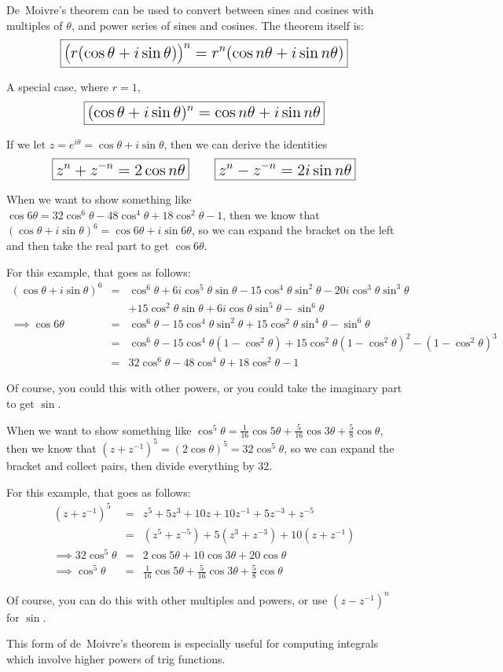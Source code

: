 \documentclass[../main.tex]{subfile}
\begin{document}

De~Moivre's theorem can be used to convert between sines and cosines with multiples of $\theta$, and power series of sines and cosines. The theorem itself is:
$$\Large \boxed{\big( r (\cos\theta + i\sin\theta) \big)^n = r^n (\cos n\theta + i\sin n\theta)}$$

A special case, where $r = 1$,
$$\Large \boxed{(\cos\theta + i\sin\theta)^n = \cos n\theta + i\sin n\theta}$$

If we let $z = e^{i\theta} = \cos\theta + i\sin\theta$, then we can derive the identities $$\Large \boxed{z^n + z^{-n} = 2\cos n\theta}\ \ \ \ \ \boxed{z^n - z^{-n} = 2i\sin n\theta}$$


When we want to show something like $\cos 6\theta = 32\cos^6 \theta - 48\cos^4 \theta + 18\cos^2 \theta - 1$, then we know that $(\cos\theta + i\sin\theta)^6 = \cos 6\theta + i\sin 6\theta$, so we can expand the bracket on the left and then take the real part to get $\cos 6\theta$.

For this example, that goes as follows:
\begin{eqnarray*}
	(\cos\theta + i\sin\theta)^6 &=& \cos^6\theta + 6i\cos^5\theta\sin\theta - 15\cos^4\theta\sin^2\theta - 20i\cos^3\theta\sin^3\theta\\
	& & + 15\cos^2\theta\sin\theta + 6i\cos\theta\sin^5\theta - \sin^6\theta\\
	\implies \cos 6\theta &=& \cos^6\theta - 15\cos^4\theta\sin^2\theta + 15\cos^2\theta\sin^4\theta - \sin^6\theta\\
	&=& \cos^6\theta - 15\cos^4\theta(1 - \cos^2\theta) + 15\cos^2\theta(1 - \cos^2\theta)^2 - (1 - \cos^2\theta)^3\\
	&=& 32\cos^6 \theta - 48\cos^4 \theta + 18\cos^2 \theta - 1
\end{eqnarray*}

Of course, you could this with other powers, or you could take the imaginary part to get $\sin$.


When we want to show something like $\cos^5\theta = \frac{1}{16}\cos 5\theta + \frac{5}{16}\cos 3\theta + \frac{5}{8}\cos\theta$, then we know that $(z + z^{-1})^5 = (2\cos\theta)^5 = 32\cos^5\theta$, so we can expand the bracket and collect pairs, then divide everything by 32.

For this example, that goes as follows:
\begin{eqnarray*}
	(z + z^{-1})^5 &=& z^5 + 5z^3 + 10z + 10z^{-1} + 5z^{-3} + z^{-5}\\
	&=& (z^5 + z^{-5}) + 5(z^3 + z^{-3}) + 10(z + z^{-1})\\
	\implies 32\cos^5\theta &=& 2\cos 5\theta + 10\cos 3\theta + 20\cos\theta\\
	\implies \cos^5\theta &=& \frac{1}{16}\cos 5\theta + \frac{5}{16}\cos 3\theta + \frac{5}{8}\cos\theta
\end{eqnarray*}

Of course, you can do this with other multiples and powers, or use $(z - z^{-1})^n$ for $\sin$.

This form of de~Moivre's theorem is especially useful for computing integrals which involve higher powers of trig functions.
\end{document}
